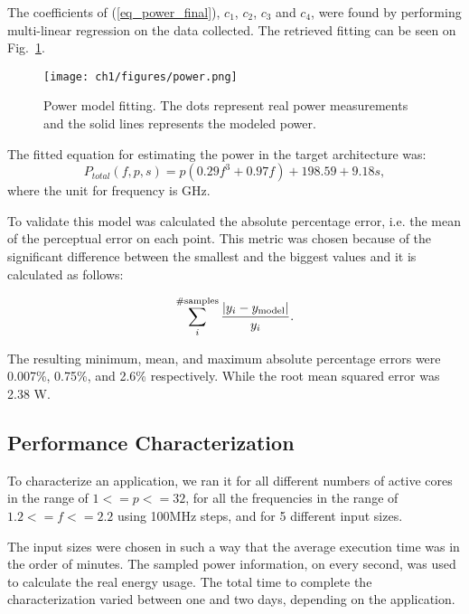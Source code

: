 The coefficients of (\ref{eq_power_final}), $c_1$, $c_2$, $c_3$ and $c_4$, were found by performing multi-linear regression on the data collected. The retrieved fitting can be seen on Fig.~\ref{fig:fitting}.

\begin{figure}[H]
\centerline{\texttt{[image: ch1/figures/power.png]}}
\caption{Power model fitting. The dots represent real power measurements and the solid lines represents the modeled power.}
\label{fig:fitting}
\end{figure}

The fitted equation for estimating the power in the target architecture was:
\begin{equation} 
P_{total}(f,p,s)=p(0.29f^3+0.97f)+198.59+9.18s, \label{eq:fittedpower}
\end{equation}
where the unit for frequency is GHz.

To validate this model was calculated the absolute percentage error, i.e. the mean of the perceptual error on each point. This metric was chosen because of the significant difference between the smallest and the biggest values and it is calculated as follows:

\begin{equation}
\sum_{i}^{\rm \# samples}{\frac{|y_i-y_{\rm model}|}{y_i}}.
\label{mpe}
\end{equation}

The resulting minimum, mean, and maximum absolute percentage errors were 0.007\%, 0.75\%, and 2.6\% respectively. While the root mean squared error was 2.38 W.

\subsection{Performance Characterization} \label{sec:performancecharacterization}

To characterize an application, we ran it for all different numbers of active cores in the range of $1<=p<=32$, for all the frequencies in the range of $1.2<=f<=2.2$ using 100MHz steps, and for 5 different input sizes.

The input sizes were chosen in such a way that the average execution time was in the order of minutes. The sampled power information, on every second, was used to calculate the real energy usage. The total time to complete the characterization varied between one and two days, depending on the application.

